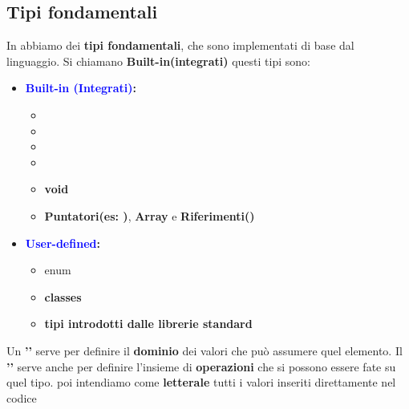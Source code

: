 \subsection{Tipi fondamentali}
In  abbiamo dei \textbf{tipi fondamentali}, che sono implementati di base dal linguaggio. Si chiamano \textbf{Built-in(integrati)}\newline
questi tipi sono: 
\begin{itemize}
    \item \textbf{\textcolor{blue}{Built-in (Integrati)}:}
        \begin{itemize}
            \item {}
            \item {}
            \item {}
            \item {}
            \item \textbf{void}
            \item \textbf{Puntatori(es: )}, \textbf{Array} e \textbf{Riferimenti()}
        \end{itemize}
    \item \textbf{\textcolor{blue}{User-defined}:}
        \begin{itemize}
            \item enum
            \item \textbf{classes}
            \item \textbf{tipi introdotti dalle librerie standard}
        \end{itemize}
\end{itemize}
Un \textbf{''} serve per definire il \textbf{dominio} dei valori che può assumere quel elemento. Il \textbf{''} serve anche per definire l'insieme di \textbf{operazioni} che si possono essere fate su quel tipo. \newline\newline
poi intendiamo come \textbf{letterale} tutti i valori inseriti direttamente nel codice


\newpage
